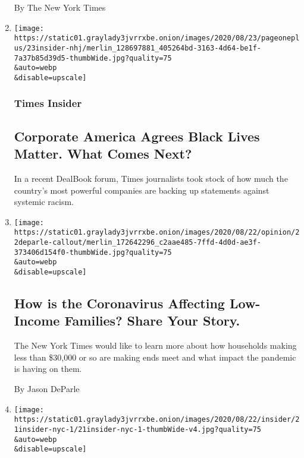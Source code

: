 \begin{enumerate}
  By The New York Times
\item
  \href{/2020/08/23/insider/business-racism.html}{}

  \texttt{[image: https://static01.graylady3jvrrxbe.onion/images/2020/08/23/pageoneplus/23insider-nhj/merlin\_128697881\_405264bd-3163-4d64-be1f-7a37b85d39d5-thumbWide.jpg?quality=75\\\&auto=webp\\\&disable=upscale]}

  \hypertarget{times-insider-7}{%
  \subsubsection{Times Insider}\label{times-insider-7}}

  \hypertarget{corporate-america-agrees-black-lives-matter-what-comes-next}{%
  \subsection{Corporate America Agrees Black Lives Matter. What Comes
  Next?}\label{corporate-america-agrees-black-lives-matter-what-comes-next}}

  In a recent DealBook forum, Times journalists took stock of how much
  the country's most powerful companies are backing up statements
  against systemic racism.
\item
  \href{/interactive/2020/08/23/reader-center/coronavirus-poverty-families-children.html}{}

  \texttt{[image: https://static01.graylady3jvrrxbe.onion/images/2020/08/22/opinion/22deparle-callout/merlin\_172642296\_c2aae485-7ffd-4d0d-ae3f-373406d154f0-thumbWide.jpg?quality=75\\\&auto=webp\\\&disable=upscale]}

  \hypertarget{how-is-the-coronavirus-affecting-low-income-families-share-your-story}{%
  \subsection{How is the Coronavirus Affecting Low-Income Families?
  Share Your
  Story.}\label{how-is-the-coronavirus-affecting-low-income-families-share-your-story}}

  The New York Times would like to learn more about how households
  making less than \$30,000 or so are making ends meet and what impact
  the pandemic is having on them.

  By Jason DeParle
\item
  \href{/2020/08/21/insider/new-york-city-pictures-pandemic.html}{}

  \texttt{[image: https://static01.graylady3jvrrxbe.onion/images/2020/08/22/insider/21insider-nyc-1/21insider-nyc-1-thumbWide-v4.jpg?quality=75\\\&auto=webp\\\&disable=upscale]}


\end{enumerate}
